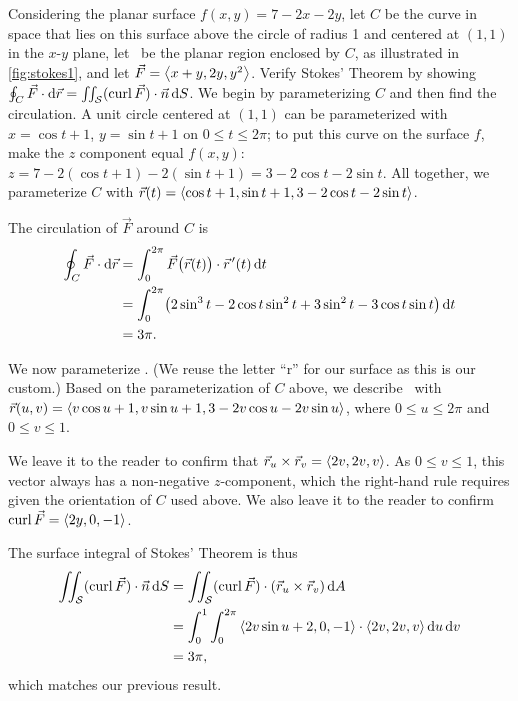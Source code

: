 \begin{example}\label{ex_stokes1}%
Considering the planar surface $f(x,y) = 7-2x-2y$, let $C$ be the curve in space that lies on this surface above the circle of radius 1 and centered at $(1,1)$ in the $x$-$y$ plane, let \surfaceS\ be the planar region enclosed by $C$, as illustrated in \autoref{fig:stokes1}, and let $\vec F =\left\langle x+y,2y, y^2\right\rangle$. Verify Stokes' Theorem by showing $\oint_C \vec F\cdot\operatorname{d}\!\vec r = \iint_{\mathcal{S}} (\operatorname{curl}\vec F)\cdot \vec n\operatorname{d}\! S$.
\solution
We begin by parameterizing $C$ and then find the circulation. A unit circle centered at $(1,1)$ can be parameterized with $x=\cos t+1$, $y=\sin t+1$ on $0\leq t\leq 2\pi$; to put this curve on the surface $f$, make the $z$ component equal $f(x,y)$: $z = 7-2(\cos t+1)-2(\sin t+1)  = 3-2\cos t - 2\sin t$. All together, we parameterize $C$ with $\vec r(t) =\left\langle \cos t+1, \sin t+1, 3-2\cos t-2\sin t\right\rangle$. 

The circulation of $\vec F$ around $C$ is
\begin{align*}
	\oint_C\vec F\cdot\operatorname{d}\!\vec r
	&= \int_0^{2\pi}\vec F\bigl(\vec r(t)\bigr)\cdot \vec r\hskip1.25pt '(t)\operatorname{d}\! t \\
	&= \int_0^{2\pi}\bigl(2\sin^3t-2\cos t\sin^2t+3\sin^2t-3\cos t\sin t\bigr)\operatorname{d}\! t \\
	&= 3\pi.
\end{align*}

We now parameterize \surfaceS. (We reuse the letter ``r'' for our surface as this is our custom.) Based on the parameterization of $C$ above, we describe \surfaceS\ with $\vec r(u,v) =\left\langle v\cos u+1, v\sin u+1, 3-2v\cos u-2v\sin u\right\rangle$, where $0\leq u\leq 2\pi$ and $0\leq v\leq 1$. 

We leave it to the reader to confirm that $\vec r_u\times \vec r_v =\left\langle 2v,2v,v\right\rangle$. As $0\leq v\leq 1$, this vector always has a non-negative $z$-component, which the right-hand rule requires given the orientation of $C$ used above. We also leave it to the reader to confirm $\operatorname{curl}\vec F =\left\langle 2y,0,-1\right\rangle$.

The surface integral of Stokes' Theorem is thus
\begin{align*}
	\iint_{\mathcal{S}} (\operatorname{curl}\vec F)\cdot \vec n\operatorname{d}\! S
	&= \iint_{\mathcal{S}} (\operatorname{curl}\vec F)\cdot (\vec r_u\times \vec r_v)\operatorname{d}\! A \\
	&= \int_0^1\int_0^{2\pi}\left\langle 2v\sin u+2,0,-1\right\rangle\cdot\left\langle 2v,2v,v\right\rangle\operatorname{d}\! u\operatorname{d}\! v\\
	&= 3\pi,
\end{align*}
which matches our previous result.
\end{example}


